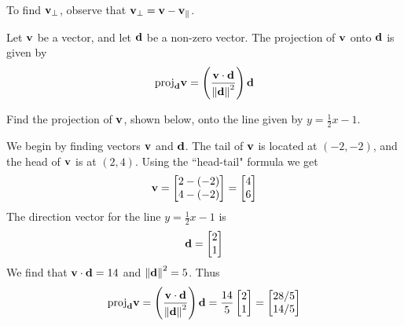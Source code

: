 \documentclass{ximera}
\renewcommand{\vec}[1]{{\bf #1}}
\newcommand{\dotp}{\cdot}
\newcommand{\norm}[1]{\left\lVert#1\right\rVert}
\begin{document}
To find $\vec{v}_{\perp}$, observe that $\vec{v}_{\perp}=\vec{v}-\vec{v}_{\parallel}$.


\begin{definition}\label{def:projection}
Let $\vec{v}$ be a vector, and let $\vec{d}$ be a non-zero vector.  The projection of $\vec{v}$ onto $\vec{d}$ is given by 
$$\text{proj}_{\vec{d}}\vec{v}=\left(\frac{\vec{v}\dotp\vec{d}}{\norm{\vec{d}}^2}\right)\vec{d}$$
\end{definition}

\begin{example}
Find the projection of $\vec{v}$, shown below, onto the line given by $y=\frac{1}{2}x-1$.

\begin{image}[2.5in]
\end{image}

\begin{explanation}
We begin by finding vectors $\vec{v}$ and $\vec{d}$. The tail of $\vec{v}$ is located at $(-2, -2)$, and the head of $\vec{v}$ is at $(2, 4)$.  Using the ``head-tail" formula we get 
$$\vec{v}=\begin{bmatrix}2-(-2)\\4-(-2)\end{bmatrix}=\begin{bmatrix}4\\6\end{bmatrix}$$ The direction vector for the line $y=\frac{1}{2}x-1$ is $$\vec{d}=\begin{bmatrix}2\\1\end{bmatrix}$$
We find that $\vec{v}\dotp\vec{d}=14$ and $\norm{\vec{d}}^2=5$.
Thus $$\text{proj}_{\vec{d}}\vec{v}=\left(\frac{\vec{v}\dotp\vec{d}}{\norm{\vec{d}}^2}\right)\vec{d}=\frac{14}{5}\begin{bmatrix}2\\1\end{bmatrix}=\begin{bmatrix}28/5\\14/5\end{bmatrix}$$
\end{explanation}
\end{example}
\end{document}
